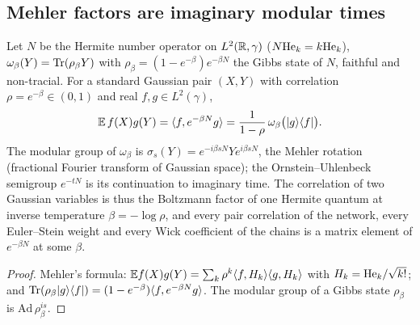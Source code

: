 \subsection{Mehler factors are imaginary modular times}
\begin{proposition}\label{prop:mehler}
Let $N$ be the Hermite number operator on $L^2(\mathbb R,\gamma)$ ($N\mathrm{He}_k=k\mathrm{He}_k$), $\omega_\beta(Y)=\operatorname{Tr}(\rho_\beta Y)$ with
$\rho_\beta=(1-e^{-\beta})e^{-\beta N}$ the Gibbs state of $N$, faithful and non-tracial. For a standard Gaussian pair
$(X,Y)$ with correlation $\rho=e^{-\beta}\in(0,1)$ and real $f,g\in L^2(\gamma)$,
\[
\mathbb E\,f(X)g(Y)=\langle f,e^{-\beta N}g\rangle=\frac1{1-\rho}\,\omega_\beta\big(|g\rangle\langle f|\big).
\]
The modular group of $\omega_\beta$ is $\sigma_s(Y)=e^{-i\beta sN}Ye^{i\beta sN}$, the Mehler rotation (fractional Fourier
transform of Gaussian space); the Ornstein--Uhlenbeck semigroup $e^{-tN}$ is its continuation to imaginary time. The
correlation of two Gaussian variables is thus the Boltzmann factor of one Hermite quantum at inverse temperature
$\beta=-\log\rho$, and every pair correlation of the network, every Euler--Stein weight and every Wick coefficient of
the chains is a matrix element of $e^{-\beta N}$ at some $\beta$.
\end{proposition}
\begin{proof}
Mehler's formula: $\mathbb E f(X)g(Y)=\sum_k\rho^k\langle f,H_k\rangle\langle g,H_k\rangle$ with $H_k=\mathrm{He}_k/\sqrt{k!}$; and
$\operatorname{Tr}(\rho_\beta|g\rangle\langle f|)=(1-e^{-\beta})\langle f,e^{-\beta N}g\rangle$. The modular group of a Gibbs state $\rho_\beta$ is
$\mathrm{Ad}\,\rho_\beta^{is}$.
\end{proof}


